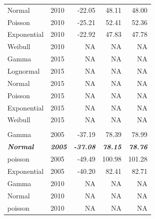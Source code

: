 \documentclass[
11pt, %
oneside, %
english, %
singlespacing, %
]{macthesis} %
\begin{document}
\begin{table}
\begin{tabular}{llrrr}
\hspace{1em}Normal & 2010 & -22.05 & 48.11 & 48.00\\
\hspace{1em}Poisson & 2010 & -25.21 & 52.41 & 52.36\\
\hspace{1em}Exponential & 2010 & -22.92 & 47.83 & 47.78\\
\hspace{1em}Weibull & 2010 & NA & NA & NA\\
\hspace{1em}Gamma & 2015 & NA & NA & NA\\
\hspace{1em}Lognormal & 2015 & NA & NA & NA\\
\hspace{1em}Normal & 2015 & NA & NA & NA\\
\hspace{1em}Poisson & 2015 & NA & NA & NA\\
\hspace{1em}Exponential & 2015 & NA & NA & NA\\
\hspace{1em}Weibull & 2015 & NA & NA & NA\\
\addlinespace[0.3em]
\multicolumn{5}{l}{\textbf{Destination: Restaurant}}\\
\hspace{1em}Gamma & 2005 & -37.19 & 78.39 & 78.99\\
\begingroup\fontsize{9}{11}\selectfont \em{\textbf{\hspace{1em}Normal}}\endgroup & \begingroup\fontsize{9}{11}\selectfont \em{\textbf{2005}}\endgroup & \begingroup\fontsize{9}{11}\selectfont \em{\textbf{-37.08}}\endgroup & \begingroup\fontsize{9}{11}\selectfont \em{\textbf{78.15}}\endgroup & \begingroup\fontsize{9}{11}\selectfont \em{\textbf{78.76}}\endgroup\\
\hspace{1em}poisson & 2005 & -49.49 & 100.98 & 101.28\\
\hspace{1em}Exponential & 2005 & -40.20 & 82.41 & 82.71\\
\hspace{1em}Gamma & 2010 & NA & NA & NA\\
\hspace{1em}Normal & 2010 & NA & NA & NA\\
\hspace{1em}poisson & 2010 & NA & NA & NA\\

\end{tabular}
\end{table}
\end{document}
